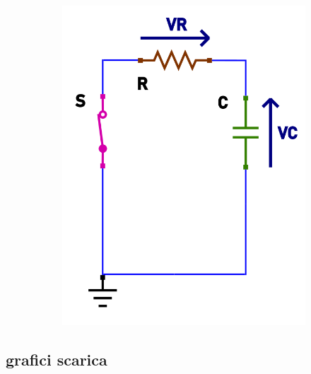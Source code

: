 \documentclass[12pt]{article}
\begin{document}
\begin{figure}[h!]
\begin{subfigure}[b]{0.347\linewidth}
    \includegraphics[width=\linewidth]{data/scarica-tensioni.png}
  \end{subfigure}
\end{figure}

\subsection*{grafici scarica}
\end{document}

